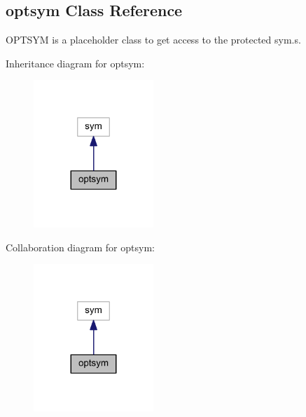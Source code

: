\hypertarget{classoptsym}{}\subsection{optsym Class Reference}
\label{classoptsym}


O\+P\+T\+S\+Y\+M is a placeholder class to get access to the protected sym.\+s.  




Inheritance diagram for optsym\+:\nopagebreak
\begin{figure}[H]
\begin{center}
\leavevmode
\includegraphics[width=128pt]{classoptsym__inherit__graph}
\end{center}
\end{figure}


Collaboration diagram for optsym\+:\nopagebreak
\begin{figure}[H]
\begin{center}
\leavevmode
\includegraphics[width=128pt]{classoptsym__coll__graph}
\end{center}
\end{figure}
